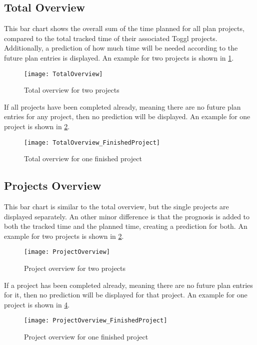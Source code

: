 \subsection{Total Overview}
This bar chart shows the overall sum of the time planned for all plan projects, compared to the total tracked time of their associated Toggl projects. Additionally, a prediction of how much time will be needed according to the future plan entries is displayed. An example for two projects is shown in \ref{figure9}.
\begin{figure}[H]
	\centering
	\texttt{[image: TotalOverview]}
	\caption{Total overview for two projects}
	\label{figure9}
\end{figure}
If all projects have been completed already, meaning there are no future plan entries for any project, then no prediction will be displayed. An example for one project is shown in \ref{figure10}.
\begin{figure}[H]
	\centering
	\texttt{[image: TotalOverview\_FinishedProject]}
	\caption{Total overview for one finished project}
	\label{figure10}
\end{figure}

\subsection{Projects Overview}
This bar chart is similar to the total overview, but the single projects are displayed separately. An other minor difference is that the prognosis is added to both the tracked time and the planned time, creating a prediction for both. An example for two projects is shown in \ref{figure10}.
\begin{figure}[H]
	\centering
	\texttt{[image: ProjectOverview]}
	\caption{Project overview for two projects}
	\label{figure11}
\end{figure}
If a project has been completed already, meaning there are no future plan entries for it, then no prediction will be displayed for that project. An example for one project is shown in \ref{figure12}.
\begin{figure}[H]
	\centering
	\texttt{[image: ProjectOverview\_FinishedProject]}
	\caption{Project overview for one finished project}
	\label{figure12}
\end{figure}

